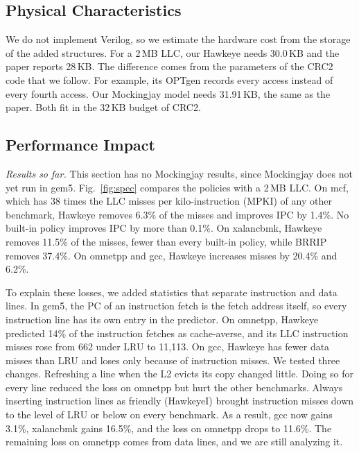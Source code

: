 \documentclass[10pt,journal,compsoc]{IEEEtran}
\begin{document}
\subsection{Physical Characteristics}

We do not implement Verilog, so we estimate the hardware cost from the
storage of the added structures. For a 2\,MB LLC, our Hawkeye needs 30.0\,KB
and the paper reports 28\,KB. The difference comes from the parameters of the
CRC2 code that we follow. For example, its OPTgen records every access instead
of every fourth access. Our Mockingjay model needs
31.91\,KB, the same as the paper. Both fit in the 32\,KB budget of CRC2.

\subsection{Performance Impact}

\emph{Results so far.} This section has no Mockingjay results, since
Mockingjay does not yet run in gem5. Fig.~\ref{fig:spec} compares the policies with a 2\,MB
LLC. On mcf, which has 38 times the LLC misses per kilo-instruction (MPKI)
of any other benchmark, Hawkeye removes 6.3\% of the misses and improves IPC
by 1.4\%. No built-in policy improves IPC by more than 0.1\%. On xalancbmk,
Hawkeye removes 11.5\% of the misses, fewer than every built-in policy, while
BRRIP removes 37.4\%. On omnetpp and gcc,
Hawkeye increases misses by 20.4\% and 6.2\%.

To explain these losses, we added statistics that separate instruction and data
lines. In gem5, the PC of an instruction fetch is the fetch address itself, so
every instruction line has its own entry in the predictor. On omnetpp,
Hawkeye predicted 14\% of the instruction fetches as cache-averse, and its LLC
instruction misses rose from 662 under LRU to 11,113. On gcc, Hawkeye has fewer
data misses than LRU and loses only because of instruction misses. We tested
three changes. Refreshing a line when the L2 evicts its copy changed little.
Doing so for every line reduced the loss on omnetpp but hurt the other
benchmarks. Always inserting instruction lines as friendly (HawkeyeI) brought
instruction misses down to the level of LRU or below on every benchmark. As a result, gcc now gains
3.1\%, xalancbmk gains 16.5\%, and the loss on omnetpp drops to 11.6\%. The
remaining loss on omnetpp comes from data lines, and we are still analyzing it.
\end{document}

